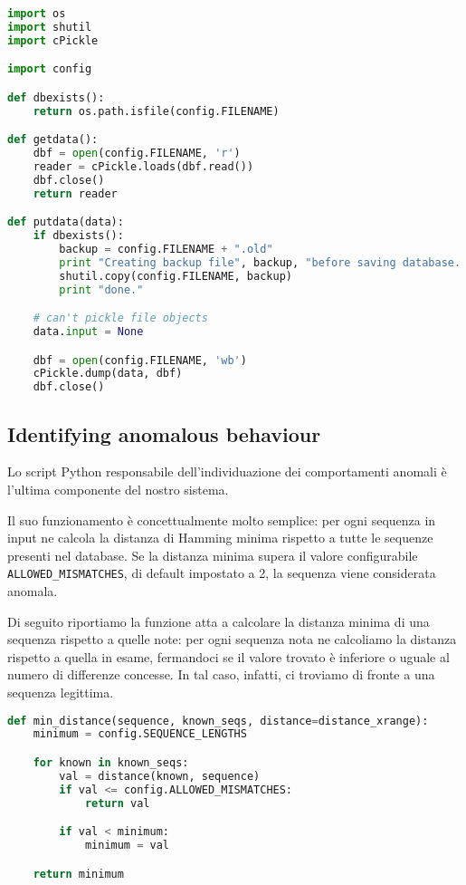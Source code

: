 \documentclass[11pt]{article}
\begin{document}
\begin{lstlisting}[language=Python]
import os
import shutil
import cPickle

import config

def dbexists():
    return os.path.isfile(config.FILENAME)

def getdata():
    dbf = open(config.FILENAME, 'r')
    reader = cPickle.loads(dbf.read())
    dbf.close()
    return reader

def putdata(data):
    if dbexists():
        backup = config.FILENAME + ".old"
        print "Creating backup file", backup, "before saving database...",
        shutil.copy(config.FILENAME, backup)
        print "done."

    # can't pickle file objects
    data.input = None

    dbf = open(config.FILENAME, 'wb')
    cPickle.dump(data, dbf)
    dbf.close()
\end{lstlisting}

\subsection{Identifying anomalous behaviour}
\label{ids:runtime}
Lo script Python responsabile dell'individuazione dei comportamenti anomali è
l'ultima componente del nostro sistema.

Il suo funzionamento è concettualmente molto semplice: per ogni sequenza in
input ne calcola la distanza di Hamming minima rispetto a tutte le sequenze
presenti nel database. Se la distanza minima supera il valore configurabile
\verb|ALLOWED_MISMATCHES|, di default impostato a 2, la sequenza viene
considerata anomala.

Di seguito riportiamo la funzione atta a calcolare la distanza minima di una
sequenza rispetto a quelle note: per ogni sequenza nota ne calcoliamo la
distanza rispetto a quella in esame, fermandoci se il valore trovato è
inferiore o uguale al numero di differenze concesse. In tal caso, infatti, ci
troviamo di fronte a una sequenza legittima.

\begin{lstlisting}[language=Python]
def min_distance(sequence, known_seqs, distance=distance_xrange):
    minimum = config.SEQUENCE_LENGTHS

    for known in known_seqs:
        val = distance(known, sequence)
        if val <= config.ALLOWED_MISMATCHES:
            return val

        if val < minimum:
            minimum = val

    return minimum
\end{lstlisting}
\end{document}
